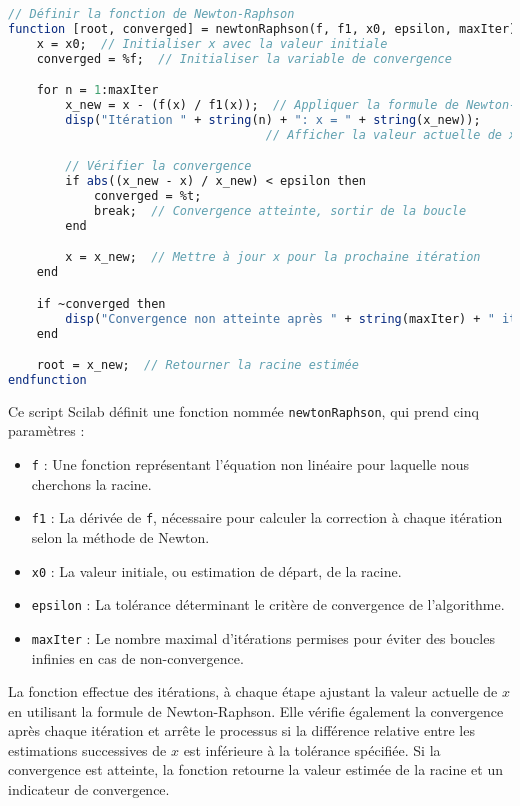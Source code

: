 \documentclass{article}
\begin{document}
\begin{lstlisting}[language=Scilab]
// Définir la fonction de Newton-Raphson
function [root, converged] = newtonRaphson(f, f1, x0, epsilon, maxIter)
    x = x0;  // Initialiser x avec la valeur initiale
    converged = %f;  // Initialiser la variable de convergence

    for n = 1:maxIter
        x_new = x - (f(x) / f1(x));  // Appliquer la formule de Newton-Raphson
        disp("Itération " + string(n) + ": x = " + string(x_new));  
                                    // Afficher la valeur actuelle de x

        // Vérifier la convergence
        if abs((x_new - x) / x_new) < epsilon then
            converged = %t;
            break;  // Convergence atteinte, sortir de la boucle
        end

        x = x_new;  // Mettre à jour x pour la prochaine itération
    end

    if ~converged then
        disp("Convergence non atteinte après " + string(maxIter) + " itérations.");
    end

    root = x_new;  // Retourner la racine estimée
endfunction
\end{lstlisting}

Ce script Scilab définit une fonction nommée \texttt{newtonRaphson}, qui prend cinq paramètres :
\begin{itemize}
    \item \texttt{f} : Une fonction représentant l'équation non linéaire pour laquelle nous cherchons la racine.
    \item \texttt{f1} : La dérivée de \texttt{f}, nécessaire pour calculer la correction à chaque itération selon la méthode de Newton.
    \item \texttt{x0} : La valeur initiale, ou estimation de départ, de la racine.
    \item \texttt{epsilon} : La tolérance déterminant le critère de convergence de l'algorithme.
    \item \texttt{maxIter} : Le nombre maximal d'itérations permises pour éviter des boucles infinies en cas de non-convergence.
\end{itemize}

La fonction effectue des itérations, à chaque étape ajustant la valeur actuelle de \( x \) en utilisant la formule de Newton-Raphson. Elle vérifie également la convergence après chaque itération et arrête le processus si la différence relative entre les estimations successives de \( x \) est inférieure à la tolérance spécifiée. Si la convergence est atteinte, la fonction retourne la valeur estimée de la racine et un indicateur de convergence.
\end{document}
